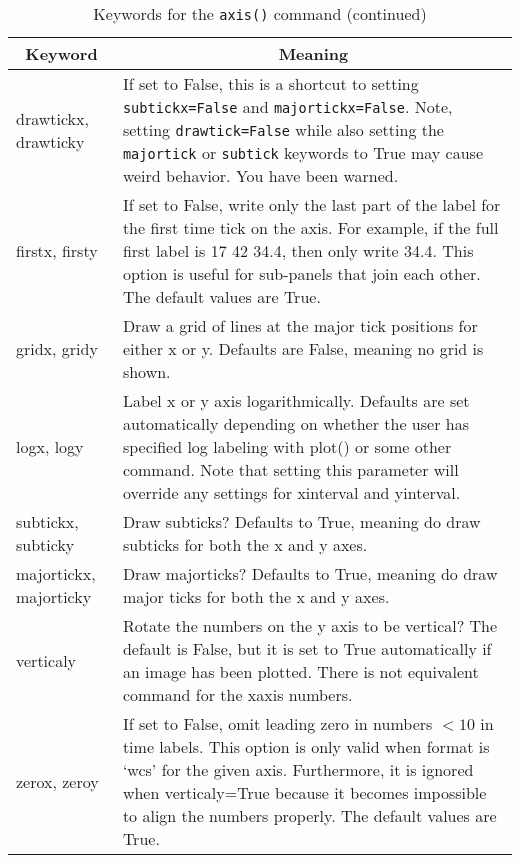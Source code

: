 \documentclass[12pt]{article}
\begin{document}
\begin{table}
\caption{Keywords for the \texttt{axis()} command (continued)}
\begin{center}
\begin{tabular}{p{1in}p{4in}}
\hline
\hline
\multicolumn{1}{c}{Keyword} & \multicolumn{1}{c}{Meaning}\\
\hline
drawtickx, drawticky   & If set to False, this is a shortcut to setting
                         \texttt{subtickx=False} and \texttt{majortickx=False}.
                         Note, setting \texttt{drawtick=False} while also
                         setting the \texttt{majortick} or \texttt{subtick}
                         keywords to True may cause weird behavior.  You have
                         been warned. \\
firstx, firsty         & If set to False, write only the last part of the label
                         for the first time tick on the axis.  For example, if
                         the full first label is 17 42 34.4, then only write
                         34.4. This option is useful for sub-panels that join
                         each other. The default values are True.\\
gridx, gridy           & Draw a grid of lines at the major tick positions for
                         either x or y.  Defaults are False, meaning no grid is
                         shown.\\
logx, logy             & Label x or y axis logarithmically.  Defaults are set
                         automatically depending on whether the user
                         has specified log labeling with plot() or some other
                         command. Note that setting this parameter will override
                         any settings for xinterval and yinterval.\\
subtickx, subticky     & Draw subticks?  Defaults to True, meaning do draw
                         subticks for both the x and y axes.\\
majortickx, majorticky & Draw majorticks? Defaults to True, meaning do draw
                         major ticks for both the x and y axes.\\
verticaly              & Rotate the numbers on the y axis to be vertical?  The
                         default is False, but it is set to True automatically
                         if an image has been plotted.  There is not equivalent
                         command for the xaxis numbers.\\
zerox, zeroy           & If set to False, omit leading zero in numbers $< 10$
                         in time labels.  This option is only valid when format
                         is `wcs' for the given axis.  Furthermore, it is
                         ignored when verticaly=True because it becomes
                         impossible to align the numbers properly.  The default
                         values are True.\\
\hline
\end{tabular}
\end{center}
\end{table}
\end{document}
